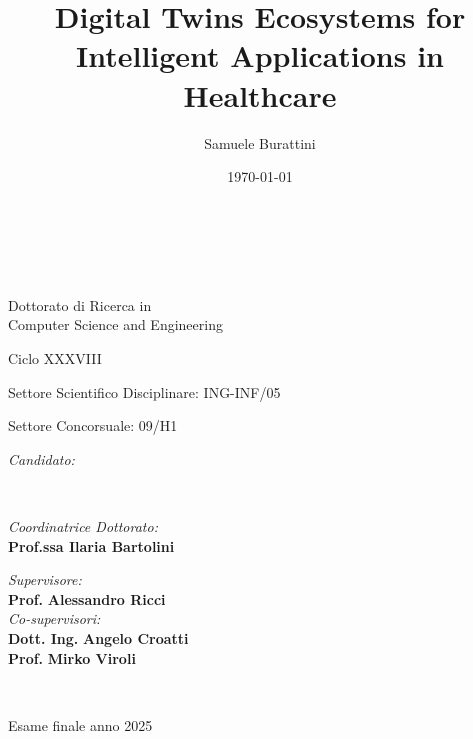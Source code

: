\title{Digital Twins Ecosystems for Intelligent Applications in Healthcare}
\author{Samuele Burattini}
\date{\today}

\begin{titlepage}
	\begin{center}

		\large
		\textbf{\unibo \\ \disi}
		\\
		\noindent\hrulefill
		\vspace{0.4cm}

		\Large
		Dottorato di Ricerca in \\
		Computer Science and Engineering

		\vspace{0.4cm}

		Ciclo XXXVIII

		\vspace{0.4cm}

		Settore Scientifico Disciplinare: ING-INF/05

		Settore Concorsuale: 09/H1

		\Huge
		\vspace{3cm}
		\textbf{
			\thetitle
		}

		{\Large{
		\vspace{3cm}

		\textit{Candidato:\\}
		\centering
		\theauthor}
		\\}
		\large
		\vspace{2.5cm}
		\begin{minipage}[t]{0.49\textwidth}
			\begin{flushleft}
				\textit{Coordinatrice Dottorato:}
				\\
				\textbf{Prof.ssa Ilaria Bartolini}
			\end{flushleft}
		\end{minipage}
		\begin{minipage}[t]{0.5\textwidth}
			\begin{flushright}
				\textit{Supervisore:}
				\\
				\textbf{Prof.} \textbf{Alessandro Ricci}
				\\
				\vspace{0.4cm}
				\textit{Co-supervisori:}
				\\
				\textbf{Dott. Ing.} \textbf{Angelo Croatti}
				\\
				\textbf{Prof.} \textbf{Mirko Viroli}
			\end{flushright}

		\end{minipage}\\

		\vfill
		\noindent\hrulefill
		\vspace{0.3cm}
		\Large

		Esame finale anno 2025
	\end{center}
\end{titlepage}
\restoregeometry
